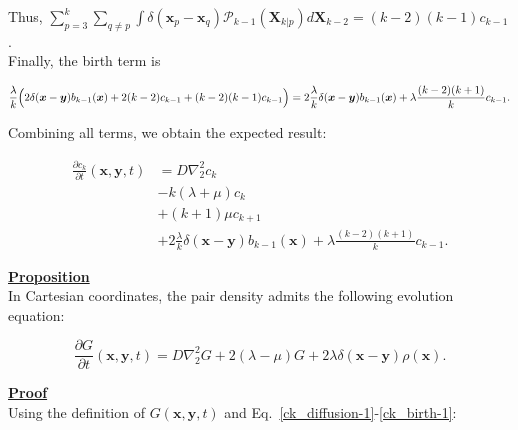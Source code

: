 Thus, $\sum_{p=3}^{k}\sum_{q\neq p} \int \delta(\boldsymbol{x}_{p}-\boldsymbol{x}_{q})\mathcal{P}_{k-1}(\boldsymbol{X}_{k|p})d\boldsymbol{X}_{k-2}=(k-2)(k-1)c_{k-1}$.\\

Finally, the birth term is

\begin{equation}
\frac{\lambda}{k}\Bigl(2\delta(\boldsymbol{x}-\boldsymbol{y})b_{k-1}(\boldsymbol{x})+2(k-2)c_{k-1}+(k-2)(k-1)c_{k-1}\Bigr)=2\frac{\lambda}{k}\delta(\boldsymbol{x}-\boldsymbol{y})b_{k-1}(\boldsymbol{x})+\lambda\frac{(k-2)(k+1)}{k}c_{k-1}.
\end{equation}

Combining all terms, we obtain the expected result:

\begin{subequations} 
\begin{align}
\frac{\partial c_{k}}{\partial t}(\boldsymbol{x},\boldsymbol{y},t) & =D\nabla_{2}^{2}c_{k}\label{ck_diffusion-2}\\
 & -k(\lambda+\mu)c_{k}\label{ck_same_state-2}\\
 & +(k+1)\mu c_{k+1}\label{ck_death-2}\\
 & +2\frac{\lambda}{k}\delta(\boldsymbol{x}-\boldsymbol{y})b_{k-1}(\boldsymbol{x})+\lambda\frac{(k-2)(k+1)}{k}c_{k-1}.\label{ck_birth-2}
\end{align}
\end{subequations}

\textbf{\underline{Proposition}}\\

In Cartesian coordinates, the pair density admits the following evolution equation:

\begin{equation} 
\frac{\partial G}{\partial t}(\boldsymbol{x},\boldsymbol{y},t) =D\nabla_{2}^{2}G +2(\lambda-\mu)G + 2\lambda\delta(\boldsymbol{x}-\boldsymbol{y})\rho(\boldsymbol{x}).
\end{equation}

\vspace{2em}

\textbf{\underline{Proof}}\\ 

Using the definition of $G(\boldsymbol{x},\boldsymbol{y},t)$ and Eq.~\ref{ck_diffusion-1}-\ref{ck_birth-1}:

